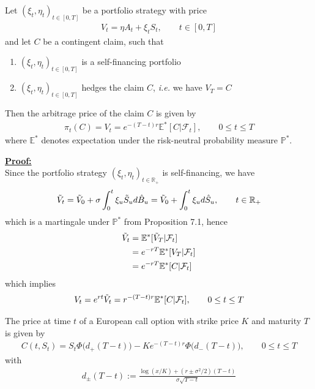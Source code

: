\documentclass[12pt]{extarticle}
\newcommand{\<}{\langle}
\renewcommand{\>}{\rangle}
\theoremstyle{definition}
\begin{document}
\begin{tcolorbox}[enhanced, drop fuzzy shadow, title=Theorem 7.3]
Let $(\xi_t, \eta_t)_{t \in [0,T]}$ be a portfolio strategy with price
\begin{align*}
    V_t = \eta A_t + \xi_t S_t, \qquad t \in [0,T]
\end{align*}
and let $C$ be a contingent claim, such that
\begin{enumerate}
    \item $(\xi_t, \eta_t)_{t \in [0,T]}$ is a self-financing portfolio
    \item $(\xi_t, \eta_t)_{t \in [0,T]}$ hedges the claim $C$, \textit{i.e.} we have $V_T = C$
\end{enumerate}
Then the arbitrage price of the claim $C$ is given by
\begin{align*}
    \pi_t (C) = V_t = e^{-(T-t)r} \mathbb{E}^*[C|\mathcal{F}_t], \qquad 0 \leq t \leq T
\end{align*}
where $\mathbb{E}^*$ denotes expectation under the risk-neutral probability measure $\mathbb{P}^*$.
\end{tcolorbox}

\underline{\textbf{Proof:}}\\
Since the portfolio strategy $(\xi_t, \eta_t)_{t \in \mathbb{R}_+}$ is self-financing, we have
\begin{align*}
    \Tilde{
    V}_t = \Tilde{
    V}_0 +\sigma \int^t_0 \xi_u \Tilde{
    S}_u d\hat{B}_u = \Tilde{
    V}_0 +\int^t_0 \xi_u d\hat{S}_u, \qquad t \in \mathbb{R}_+
\end{align*}
which is a martingale under $\mathbb{P}^*$ from Proposition 7.1, hence
\begin{align*}
    \Tilde{V}_t &= \mathbb{E}^*[\Tilde{V}_T |\mathcal{F}_t]\\
    &= e^{-rT}\mathbb{E}^*[V_T |\mathcal{F}_t]\\
    &= e^{-rT}\mathbb{E}^*[C |\mathcal{F}_t]
\end{align*}
which implies
\begin{align*}
    V_t = e^{rt} \Tilde{V}_t = r^{-(T-t)r} \mathbb{E}^* [C|\mathcal{F}_t], \qquad 0 \leq t \leq T
\end{align*}

\begin{tcolorbox}[enhanced, drop fuzzy shadow, title=Proposition 7.4]
The price at time $t$ of a European call option with strike price $K$ and maturity $T$ is given by
\begin{align*}
    C(t, S_t) = S_t \Phi\big(d_+(T-t)\big) -Ke^{-(T-t)r} \Phi\big(d_-(T-t)\big), \qquad 0 \leq t \leq T
\end{align*}
with
\begin{align*}
    d_\pm (T-t):= \frac{\log(x/K) +(r \pm \sigma^2/2)(T-t)}{\sigma \sqrt{T-t}}
\end{align*}
\end{tcolorbox}
\end{document}
